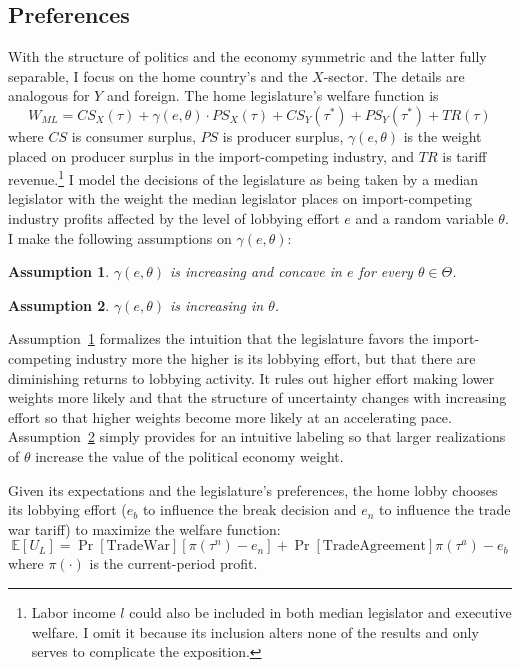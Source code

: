 \documentclass[10pt]{article}
\newtheorem{assumption}{Assumption}
\newcommand{\ve}{\theta}
\newcommand{\ta}{\theta}
\newcommand{\expect}{\mathbb{E}}
\newcommand{\ga}{\gamma}
\begin{document}
\subsection{Preferences}
\label{sec:pref}
With the structure of politics and the economy symmetric and the latter fully separable, I focus on the home country's and the $X$-sector. The details are analogous for $Y$ and foreign. The home legislature's welfare function is
\begin{equation}
  W_{\mathit{ML}} = \mathit{CS}_X(\tau) + \ga(e,\ve) \cdot \mathit{PS}_X(\tau) + \mathit{CS}_Y(\tau^*) + \mathit{PS}_Y(\tau^*) + \mathit{TR}(\tau)
  \label{eq:ml}
\end{equation}
where $\mathit{CS}$ is consumer surplus, $\mathit{PS}$ is producer surplus, $\ga(e,\ta)$ is the weight placed on producer surplus in the import-competing industry, and $\mathit{TR}$ is tariff revenue.\footnote{Labor income $l$ could also be included in both median legislator and executive welfare. I omit it because its inclusion alters none of the results and only serves to complicate the exposition.} I model the decisions of the legislature as being taken by a median legislator with the weight the median legislator places on import-competing industry profits affected by the level of lobbying effort $e$ and a random variable $\ta$. I make the following assumptions on $\ga(e,\ta)$:

\begin{assumption}
  $\ga(e,\ta)$ is increasing and concave in $e$ for every $\ta \in \Theta$.
  \label{as:ga_c}
\end{assumption}

\begin{assumption}
  $\ga(e,\ta)$ is increasing in $\ta$.
  \label{as:ga_ta}
\end{assumption}

Assumption~\ref{as:ga_c} formalizes the intuition that the legislature favors the import-competing industry more the higher is its lobbying effort, but that there are diminishing returns to lobbying activity. It rules out higher effort making lower weights more likely and that the structure of uncertainty changes with increasing effort so that higher weights become more likely at an accelerating pace. Assumption~\ref{as:ga_ta} simply provides for an intuitive labeling so that larger realizations of $\ta$ increase the value of the political economy weight.

Given its expectations and the legislature's preferences, the home lobby chooses its lobbying effort ($e_b$ to influence the break decision and $e_n$ to influence the trade war tariff) to maximize the welfare function:
\begin{equation}
  \expect \left[U_L \right] = \Pr\left[ \text{TradeWar} \right] \left[ \pi(\tau^{\mathit{n}}) - e_n \right] + \Pr\left[ \text{TradeAgreement} \right] \pi(\tau^a) - e_b
  \label{eq:lv}
\end{equation}
where $\pi(\cdot)$ is the current-period profit. 
\end{document}
